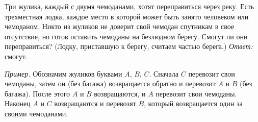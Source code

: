 \problem{}
Три жулика, каждый с двумя чемоданами, хотят переправиться через реку.
Есть трехместная лодка, каждое место в которой может быть занято человеком или
чемоданом.
Никто из жуликов не доверит свой чемодан спутникам в свое отсутствие, но готов
оставить чемоданы на безлюдном берегу.
Смогут ли они переправиться?
(Лодку, приставшую к берегу, считаем частью берега.)
\solution
\emph{Ответ:} смогут.
\par
\emph{Пример.}
Обозначим жуликов буквами $A$, $B$, $C$.
Сначала $C$ перевозит свои чемоданы, затем он (без багажа) возвращается обратно
и перевозит $A$ и $B$ (без багажа).
После этого $A$ и $B$ возвращаются, и $A$ перевозит свои чемоданы.
Наконец $A$ и $C$ возвращаются и перевозят $B$, который возвращается один за
своими чемоданами.
\endproblem
